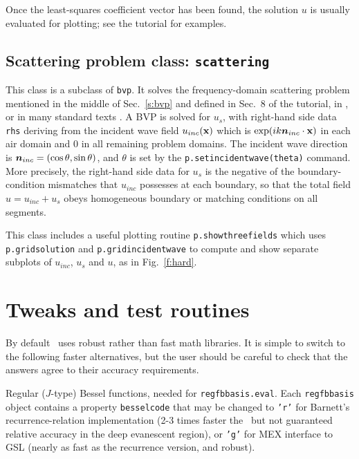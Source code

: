 \documentclass[12pt]{article}
\begin{document}
Once the least-squares coefficient vector has been found, the
solution $u$ is usually evaluated for plotting; see the tutorial for examples.



\subsection{Scattering problem class: {\tt scattering}}

This class is a subclass of {\tt bvp}.
It solves the frequency-domain
scattering problem mentioned in the middle of Sec.~\ref{s:bvp}
and defined in Sec.~8 of the tutorial, in \cite{polygonscatt},
or in many standard texts \cite{coltonkress}.
A BVP is solved for $u_s$, with right-hand side data {\tt rhs} deriving
from the incident wave field $u_{inc}(\textbf{x})$
which is $\exp(ik {\bm n}_{inc} \cdot \textbf{x})$ in each air domain
and 0 in all remaining problem domains.
The incident wave direction is ${\bm n}_{inc} = (\cos \theta,\sin \theta)$,
and $\theta$ is set by the {\tt p.setincidentwave(theta)} command.
More precisely, the right-hand side data for $u_s$ is
the negative of the boundary-condition mismatches that $u_{inc}$
possesses at each boundary, so that the total field $u=u_{inc}+u_s$ obeys
homogeneous boundary or matching conditions on all segments.

This class includes a useful plotting routine
{\tt p.showthreefields} which uses {\tt p.gridsolution} and
{\tt p.gridincidentwave} to compute and show separate subplots of
$u_{inc}$, $u_s$ and $u$, as in Fig.~\ref{f:hard}.




\section{Tweaks and test routines}
\label{s:tweak}

By default \mpspack\ uses robust rather than fast math libraries.
It is simple to switch to the following
faster alternatives, but the user should be careful
to check that the answers agree to their accuracy requirements.
\ben
\item Regular ($J$-type) Bessel functions, needed for {\tt regfbbasis.eval}.
Each {\tt regfbbasis} object contains a property {\tt besselcode}
that may be changed to {\tt 'r'} for Barnett's recurrence-relation
implementation (2-3 times faster the \matlab\ but
not guaranteed relative accuracy in
the deep evanescent region),
or {\tt 'g'} for MEX interface to GSL (nearly as fast as the recurrence
version, and robust).
\end{document}
